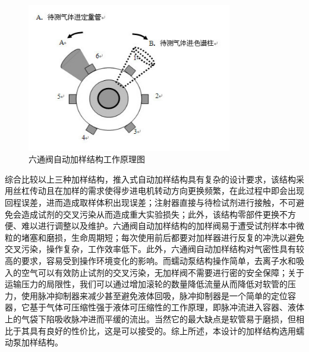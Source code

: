 \begin{figure}[htbp!]
  \centering
  \includegraphics[height=6.5cm]{chap/figure/2-3.jpg}
  \caption{六通阀自动加样结构工作原理图}
  \label{fig:2-3}
\end{figure}

综合比较以上三种加样结构，推入式自动加样结构具有复杂的设计要求，该结构采用丝杠传动且在加样的需求使得步进电机转动方向更换频繁，在此过程中即会出现回程误差，进而造成取样体积出现误差；注射器直接与待检试剂进行接触，不可避免会造成试剂的交叉污染从而造成重大实验损失；此外，该结构零部件更换不方便、难以进行调整以及维护。六通阀自动加样结构的加样阀易于遭受试剂样本中微粒的堵塞和磨损，生命周期短；每次使用前后都要对加样器进行反复的冲洗以避免交叉污染，操作复杂，工作效率低下。此外，六通阀自动加样结构对气密性具有较高的要求，容易受到操作环境变化的影响。而蠕动泵结构操作简单，去离子水和吸入的空气可以有效防止试剂的交叉污染，无加样阀不需要进行密的安全保障；关于运输压力的局限性，我们可以通过增加滚轮的数量降低流量从而降低对软管的压力，使用脉冲抑制器来减少甚至避免液体回吸，脉冲抑制器是一个简单的定位容器，它基于气体可压缩性强于液体可压缩性的工作原理，即脉冲流进入容器、液体上的气袋下陷吸收脉冲进而平缓的流出。当然它的最大缺点是软管易于磨损，但相比于其具有良好的性价比，这是可以接受的。综上所述，本设计的加样结构选用蠕动泵加样结构。



















